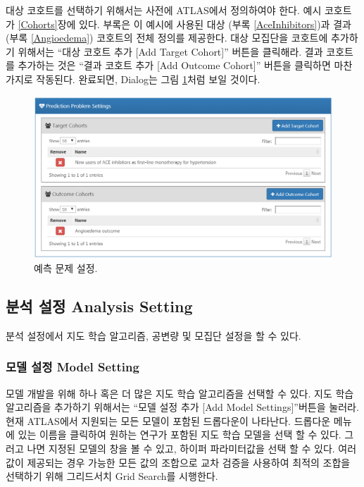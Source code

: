 \documentclass[10.5pt]{book}
\theoremstyle{definition}
\theoremstyle{definition}
\theoremstyle{definition}
\theoremstyle{remark}
\begin{document}
대상 코호트를 선택하기 위해서는 사전에 ATLAS에서 정의하여야 한다. 예시
코호트가 \ref{Cohorts}장에 있다. 부록은 이 예시에 사용된 대상 (부록
\ref{AceInhibitors})과 결과 (부록 \ref{Angioedema}) 코호트의 전체 정의를
제공한다. 대상 모집단을 코호트에 추가하기 위해서는 ``대상 코호트 추가
{[}Add Target Cohort{]}'' 버튼을 클릭해라. 결과 코호트를 추가하는 것은
``결과 코호트 추가 {[}Add Outcome Cohort{]}'' 버튼을 클릭하면 마찬가지로
작동된다. 완료되면, Dialog는 그림 \ref{fig:problemSettings}처럼 보일
것이다.

\begin{figure}

{\centering \includegraphics[width=1\linewidth]{images/PatientLevelPrediction/problemSettings} 

}

\caption{예측 문제 설정.}\label{fig:problemSettings}
\end{figure}

\subsection{분석 설정 Analysis Setting}\label{--analysis-setting}

분석 설정에서 지도 학습 알고리즘, 공변량 및 모집단 설정을 할 수 있다.

\subsubsection*{모델 설정 Model Setting}\label{--model-setting}

모델 개발을 위해 하나 혹은 더 많은 지도 학습 알고리즘을 선택할 수 있다.
지도 학습 알고리즘을 추가하기 위해서는 ``모델 설정 추가 {[}Add Model
Settings{]}''버튼을 눌러라. 현재 ATLAS에서 지원되는 모든 모델이 포함된
드롭다운이 나타난다. 드롭다운 메뉴에 있는 이름을 클릭하여 원하는 연구가
포함된 지도 학습 모델을 선택 할 수 있다. 그러고 나면 지정된 모델의 창을
볼 수 있고, 하이퍼 파라미터값을 선택 할 수 있다. 여러 값이 제공되는 경우
가능한 모든 값의 조합으로 교차 검증을 사용하여 최적의 조합을 선택하기
위해 그리드서치 Grid Search를 시행한다.
\end{document}
